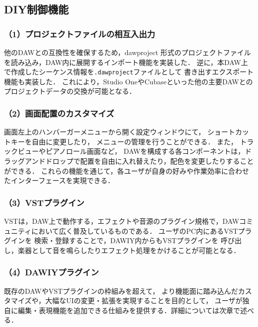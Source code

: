 \subsection{DIY制御機能}


\subsubsection*{（1）プロジェクトファイルの相互入出力}
他のDAWとの互換性を確保するため，dawproject\cite{dawproject-github}
形式のプロジェクトファイルを読み込み，DAW内に展開するインポート機能を実装した．
逆に，本DAW上で作成したシーケンス情報を\texttt{.dawproject}ファイルとして
書き出すエクスポート機能も実装した．
これにより，Studio OneやCubaseといった他の主要DAWとの
プロジェクトデータの交換が可能となる．





\subsubsection*{（2）画面配置のカスタマイズ}
画面左上のハンバーガーメニューから開く設定ウィンドウにて，
ショートカットキーを自由に変更したり，
メニューの管理を行うことができる．
また，
トラックビューやピアノロール画面など，
DAWを構成する各コンポーネントは，ドラッグアンドドロップで配置を自由に入れ替えたり，配色を変更したりすることができる．
これらの機能を通じて，各ユーザが自身の好みや作業効率に合わせたインターフェースを実現できる．

\subsubsection*{（3）VSTプラグイン}
VSTは，DAW上で動作する，エフェクトや音源のプラグイン規格で，DAWコミュニティにおいて広く普及しているものである．
ユーザのPC内にあるVSTプラグインを
検索・登録することで，DAWIY内からもVSTプラグインを
呼び出し，楽器として音を鳴らしたりエフェクト処理をかけることが可能となる．

\subsubsection*{（4）DAWIYプラグイン}
既存のDAWやVSTプラグインの枠組みを超えて，
より機能面に踏み込んだカスタマイズや，大幅なUIの変更・拡張を実現することを目的として，
ユーザが独自に編集・表現機能を追加できる仕組みを提供する．詳細については次章で述べる．


